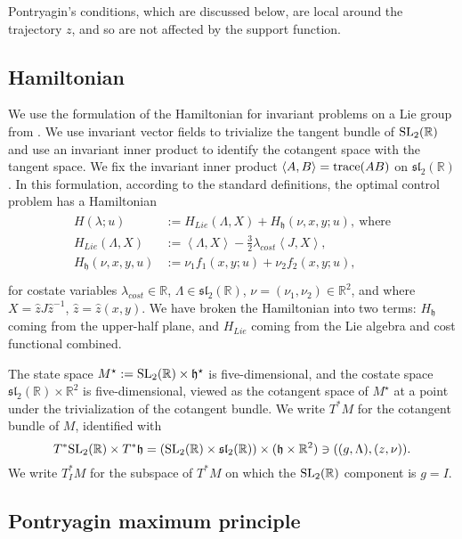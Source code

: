 \documentclass{article}
\theoremstyle{remark}
\newcommand{\ring}[1]{\mathbb{#1}}
\newcommand{\op}[1]{\hbox{#1}}
\newcommand{\ang}[1]{\left\langle{#1}\right\rangle}
\def\sl{\mathfrak{sl}_2(\ring{R})}
\def\SL{\op{SL}_2(\ring{R})}
\def\h{\mathfrak h}
\def\hstar{{\mathfrak h}^\star}
\def\Mstar{M^\star}
\def\Hlie{H_{Lie}}
\begin{document}
Pontryagin's conditions, which are discussed below, are
local around the trajectory $z$, and so are not affected by the
support function.





\subsection{Hamiltonian}\label{sec:ham}


We use the formulation of the Hamiltonian for invariant problems on a
Lie group from \cite[Ch.18]{agrachev2013control}.  We
use invariant vector fields to trivialize the tangent bundle of $\SL$
and use an invariant inner product to identify the cotangent space
with the tangent space.  We fix the invariant inner product $\ang{A,B}
= \op{trace}(AB)$ on $\sl$.  In this formulation, according to the standard
definitions,  the optimal control
problem has a Hamiltonian
\begin{align}\label{eqn:ham}
\begin{split}
H(\lambda;u)&:=
\Hlie(\Lambda,X) + H_{\h}(\nu,x,y;u), 
~\text{where}\\
\Hlie(\Lambda,X) &:= 
\ang{\Lambda,X} - \frac{3}{2} \lambda_{cost} \ang{J,X},\\
H_{\h}(\nu,x,y,u)&:= 
\nu_1 f_1(x,y;u) + \nu_2 f_2(x,y;u),\\
\end{split}
\end{align}
 for
costate variables $\lambda_{cost}\in\ring{R}$, $\Lambda\in \sl$, 
$\nu=(\nu_1,\nu_2)\in\ring{R}^2$,
and where $X = \hat z J \hat z^{-1}$, $\hat z = \hat z(x,y)$.  We
have broken the Hamiltonian into two terms: $H_{\h}$ coming from the
upper-half plane, and $\Hlie$ coming from the Lie algebra and cost
functional combined.

The state space $\Mstar:=\SL\times \hstar$ is five-dimensional, and
  the costate space $\sl\times\ring{R}^2$ is five-dimensional,
viewed as the
cotangent space of $\Mstar$ at a point under the trivialization of the
cotangent bundle.  We write $T^*M$ for the cotangent bundle of $M$,
identified with
\[
T^*\SL\times T^*\h = (\SL\times\sl)\times (\h\times\ring{R}^2)
\ni((g,\Lambda),(z,\nu)).
\]
We write $T_I^*M$ for the subspace of $T^*M$ on which the $\SL$
component is $g=I$.

\subsection{Pontryagin maximum principle}\label{sec:pmp}
\end{document}
